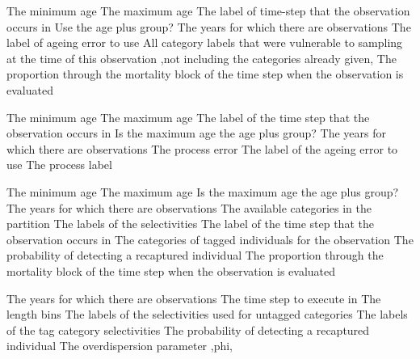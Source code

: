  {The minimum age}
 {The maximum age}
 {The label of time-step that the observation occurs in}
 {Use the age plus group?}
 {The years for which there are observations}
 {The label of ageing error to use}
 {All category labels that were vulnerable to sampling at the time of this observation ,not including the categories already given,}
 {The proportion through the mortality block of the time step when the observation is evaluated}
\par\textbf{}\par
{} {The minimum age}
 {The maximum age}
 {The label of the time step that the observation occurs in}
 {Is the maximum age the age plus group?}
 {The years for which there are observations}
 {The process error}
 {The label of the ageing error to use}
 {The process label}
\par\textbf{}\par
{} {The minimum age}
 {The maximum age}
 {Is the maximum age the age plus group?}
 {The years for which there are observations}
 {The available categories in the partition}
 {The labels of the selectivities}
 {The label of the time step that the observation occurs in}
 {The categories of tagged individuals for the observation}
 {The probability of detecting a recaptured individual}
 {The proportion through the mortality block of the time step when the observation is evaluated}
\par\textbf{}\par
{} {The years for which there are observations}
 {The time step to execute in}
 {The length bins}
 {The labels of the selectivities used for untagged categories}
 {The labels of the tag category selectivities}
 {The probability of detecting a recaptured individual}
 {The overdispersion parameter ,phi,}
